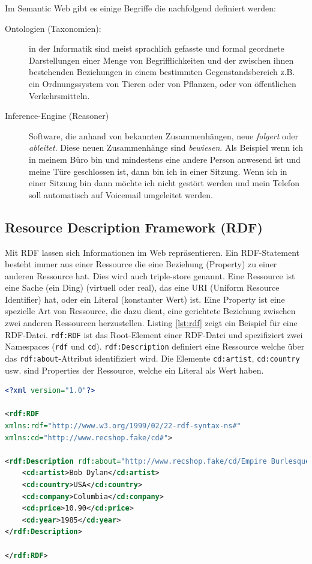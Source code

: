 Im Semantic Web gibt es einige Begriffe die nachfolgend definiert werden:
\begin{description}
	\item[Ontologien (Taxonomien):] in der Informatik sind meist sprachlich gefasste und formal geordnete Darstellungen einer Menge von Begrifflichkeiten und der zwischen ihnen bestehenden Beziehungen in einem bestimmten Gegenstandsbereich z.B. ein Ordnungssystem von Tieren oder von Pflanzen, oder von öffentlichen Verkehrsmitteln.
	\item[Inference-Engine (Reasoner)] Software, die anhand von bekannten Zusammenhängen, neue \textit{folgert} oder \textit{ableitet}. Diese neuen Zusammenhänge sind \textit{bewiesen}. Als Beispiel wenn ich in meinem Büro bin und mindestens eine andere Person anwesend ist und meine Türe geschlossen ist, dann bin ich in einer Sitzung. Wenn ich in einer Sitzung bin dann möchte ich nicht gestört werden und mein Telefon soll automatisch auf Voicemail umgeleitet werden.
\end{description}

\subsection{Resource Description Framework (RDF)}

Mit RDF lassen sich Informationen im Web repräsentieren. Ein RDF-Statement besteht immer aus einer Ressource die eine Beziehung (Property) zu einer anderen Ressource hat. Dies wird auch triple-store genannt. Eine Ressource ist eine Sache (ein Ding) (virtuell oder real), das eine URI (Uniform Resource Identifier) hat, oder ein Literal (konstanter Wert) ist. Eine Property ist eine spezielle Art von Ressource, die dazu dient, eine gerichtete Beziehung zwischen zwei anderen Ressourcen herzustellen. Listing \ref{lst:rdf} zeigt ein Beispiel für eine RDF-Datei. \verb|rdf:RDF| ist das Root-Element einer RDF-Datei und spezifiziert zwei Namespaces (\verb|rdf| und \verb|cd|). \verb|rdf:Description| definiert eine Ressource welche über das \verb|rdf:about|-Attribut identifiziert wird. Die Elemente \verb|cd:artist|, \verb|cd:country| usw. sind Properties der Ressource, welche ein Literal als Wert haben.

\begin{lstlisting}[language=XML, caption=RDF Beispiel, label=lst:rdf]
<?xml version="1.0"?>

<rdf:RDF
xmlns:rdf="http://www.w3.org/1999/02/22-rdf-syntax-ns#"
xmlns:cd="http://www.recshop.fake/cd#">

<rdf:Description rdf:about="http://www.recshop.fake/cd/Empire Burlesque">
	<cd:artist>Bob Dylan</cd:artist>
	<cd:country>USA</cd:country>
	<cd:company>Columbia</cd:company>
	<cd:price>10.90</cd:price>
	<cd:year>1985</cd:year>
</rdf:Description>

</rdf:RDF>
\end{lstlisting}

